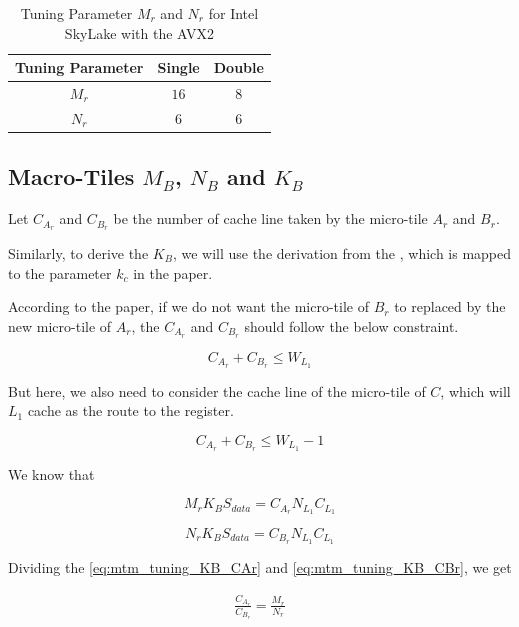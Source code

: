 \begin{table}[ht]
    \centering
    \caption{Tuning Parameter $M_r$ and $N_r$ for Intel SkyLake with the AVX2}
    \begin{tabular}{|c|c|c|}
        \hline
        \textbf{Tuning Parameter} & \textbf{Single} & \textbf{Double}\\
        \hline
        $M_r$   & $16$ & $8$ \\
        \hline
        $N_r$   & $6$ & $6$ \\
        \hline
    \end{tabular}
\end{table}

\subsection{Macro-Tiles $M_B$, $N_B$ and $K_B$}

Let $C_{A_r}$ and $C_{B_r}$ be the number of cache line taken by the micro-tile $A_r$ and $B_r$.

Similarly, to derive the $K_B$, we will use the derivation from the \cite{BLIS}, which is 
mapped to the parameter $k_c$ in the paper.

According to the paper, if we do not want the micro-tile of $B_r$ 
to replaced by the new micro-tile of $A_r$, the $C_{A_r}$ and $C_{B_r}$  should 
follow the below constraint.

\[C_{A_r} + C_{B_r} \leq W_{L_1}\]

But here, we also need to consider the cache line of the micro-tile of $C$, which will $L_1$
cache as the route to the register.

\begin{equation}
    C_{A_r} + C_{B_r} \leq W_{L_1} - 1
    \label{eq:mtm_tuning_CAr_CBr}
\end{equation}

We know that

\begin{equation}
    M_r K_B S_{data} = C_{A_r} N_{L_1} C_{L_1}
    \label{eq:mtm_tuning_KB_CAr}
\end{equation}

\begin{equation}
    N_r K_B S_{data} = C_{B_r} N_{L_1} C_{L_1}
    \label{eq:mtm_tuning_KB_CBr}
\end{equation}

Dividing the \ref{eq:mtm_tuning_KB_CAr} and \ref{eq:mtm_tuning_KB_CBr}, we get

\begin{align*}
    \frac{C_{A_r}}{C_{B_r}} = \frac{M_r}{N_r}
\end{align*}

